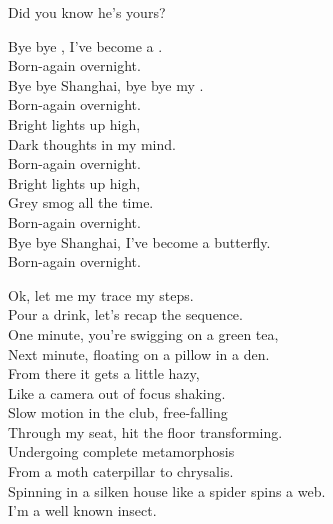 Did you know he's yours? \\





Bye bye , I've become a . \\
Born-again overnight. \\
Bye bye Shanghai, bye bye my . \\
Born-again overnight. \\

Bright lights up high, \\
Dark thoughts in my mind. \\
Born-again overnight. \\

Bright lights up high, \\
Grey smog all the time. \\
Born-again overnight. \\

Bye bye Shanghai, I've become a butterfly. \\
Born-again overnight. \\


Ok, let me my trace my steps. \\
Pour a drink, let's recap the sequence. \\
One minute, you're swigging on a green tea, \\
Next minute, floating on a pillow in a den. \\

From there it gets a little hazy, \\
Like a camera out of focus shaking. \\
Slow motion in the club, free-falling \\
Through my seat, hit the floor transforming. \\

Undergoing complete metamorphosis \\
From a moth caterpillar to chrysalis. \\
Spinning in a silken house like a spider spins a web. \\
I'm a well known insect. \\

